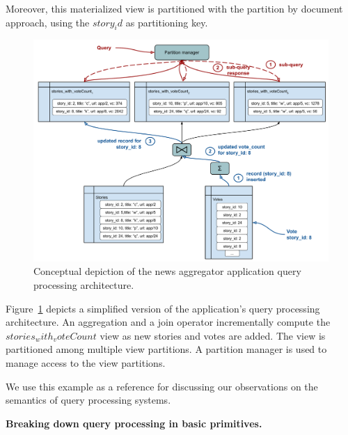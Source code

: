 Moreover, this materialized view is partitioned with the partition by document approach, using the $story_id$ as partitioning key.

\begin{figure}[H]
  \centering
    \includegraphics[width=\textwidth]{./figures/design_pattern/running_example.pdf}
    \caption{Conceptual depiction of the news aggregator application query processing architecture.}
    \label{fig:running_example}
\end{figure}


Figure~\ref{fig:running_example} depicts a simplified version of the application's query processing architecture.
An aggregation and a join operator incrementally compute the $stories_with_voteCount$ view as new stories and votes are added.
The view is partitioned among multiple view partitions.
A partition manager is used to manage access to the view partitions.

We use this example as a reference for discussing our observations on the semantics of query processing systems.

\vspace{12pt}
\noindent
\textbf{Breaking down query processing in basic primitives.}

